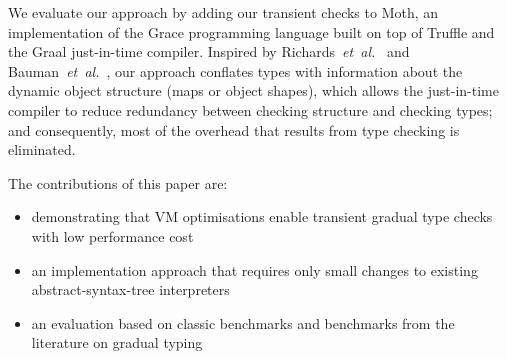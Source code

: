 We evaluate our approach by adding our transient checks to Moth,
an implementation of the Grace programming language
built on top of Truffle
and the Graal just-in-time compiler\citep{Wurthinger2013,Wurthinger:2017:PPE}.
Inspired by Richards~\textit{et~al.}~\cite{Richards2017} and
Bauman~\textit{et~al.}~\cite{Bauman2017},
our approach conflates types
with information about the dynamic object structure 
(maps\citep{Self} or object shapes\citep{woss2014object}), 
which allows the just-in-time compiler
to reduce redundancy between checking structure
and checking types; and consequently, most of the overhead 
that results from type checking is eliminated.



The contributions of this paper are:

\begin{itemize}
\item demonstrating that VM optimisations enable
        transient gradual type checks with low performance cost
\item an implementation approach that requires
      only small changes to existing abstract-syntax-tree interpreters
\item an evaluation based on classic benchmarks
      and benchmarks from the literature on gradual typing
\end{itemize}
